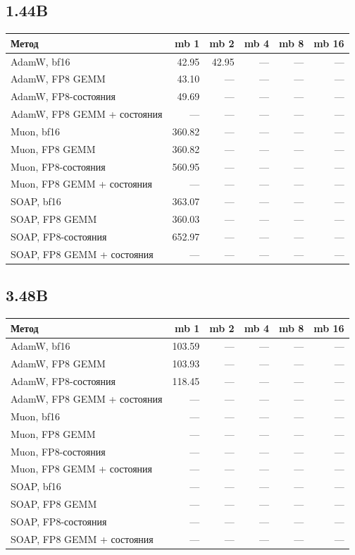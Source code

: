 \documentclass[10pt]{article}
\begin{document}
\subsection{1.44B}
\begin{center}
\small
\begin{tabular}{lrrrrr}
\toprule
\textbf{Метод} & \textbf{mb 1} & \textbf{mb 2} & \textbf{mb 4} & \textbf{mb 8} & \textbf{mb 16} \\
\midrule
AdamW, bf16 & 42.95 & 42.95 & --- & --- & --- \\
AdamW, FP8 GEMM & 43.10 & --- & --- & --- & --- \\
AdamW, FP8-состояния & 49.69 & --- & --- & --- & --- \\
AdamW, FP8 GEMM + состояния & --- & --- & --- & --- & --- \\
Muon, bf16 & 360.82 & --- & --- & --- & --- \\
Muon, FP8 GEMM & 360.82 & --- & --- & --- & --- \\
Muon, FP8-состояния & 560.95 & --- & --- & --- & --- \\
Muon, FP8 GEMM + состояния & --- & --- & --- & --- & --- \\
SOAP, bf16 & 363.07 & --- & --- & --- & --- \\
SOAP, FP8 GEMM & 360.03 & --- & --- & --- & --- \\
SOAP, FP8-состояния & 652.97 & --- & --- & --- & --- \\
SOAP, FP8 GEMM + состояния & --- & --- & --- & --- & --- \\
\bottomrule
\end{tabular}
\end{center}
\subsection{3.48B}
\begin{center}
\small
\begin{tabular}{lrrrrr}
\toprule
\textbf{Метод} & \textbf{mb 1} & \textbf{mb 2} & \textbf{mb 4} & \textbf{mb 8} & \textbf{mb 16} \\
\midrule
AdamW, bf16 & 103.59 & --- & --- & --- & --- \\
AdamW, FP8 GEMM & 103.93 & --- & --- & --- & --- \\
AdamW, FP8-состояния & 118.45 & --- & --- & --- & --- \\
AdamW, FP8 GEMM + состояния & --- & --- & --- & --- & --- \\
Muon, bf16 & --- & --- & --- & --- & --- \\
Muon, FP8 GEMM & --- & --- & --- & --- & --- \\
Muon, FP8-состояния & --- & --- & --- & --- & --- \\
Muon, FP8 GEMM + состояния & --- & --- & --- & --- & --- \\
SOAP, bf16 & --- & --- & --- & --- & --- \\
SOAP, FP8 GEMM & --- & --- & --- & --- & --- \\
SOAP, FP8-состояния & --- & --- & --- & --- & --- \\
SOAP, FP8 GEMM + состояния & --- & --- & --- & --- & --- \\
\bottomrule
\end{tabular}
\end{center}
\end{document}

